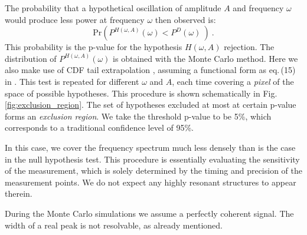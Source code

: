 The probability that a hypothetical oscillation of amplitude $A$ and frequency $\omega$ would produce less power at frequency $\omega$ then observed is:
\begin{equation}
  \mathrm{Pr}\left( P^{H(\omega, A)}(\omega) < P^D(\omega)\ \right) \ .
\end{equation}
This probability is the p-value for the hypothesis $H(\omega, A)$ rejection. The distribution of $P^{H(\omega, A)}(\omega)$ is obtained with the Monte Carlo method. Here we also make use of CDF tail extrapolation , assuming a functional form as eq.\,(15) in \cite{Scargle1982} . This test is repeated for different $\omega$ and $A$, each time covering a \emph{pixel} of the space of possible hypotheses. This procedure is shown schematically in Fig.\,\ref{fig:exclusion_region}. The set of hypotheses excluded at most at certain p-value forms an \emph{exclusion region}. We take the threshold p-value to be 5\%, which corresponds to a traditional confidence level of 95\%.

In this case, we cover the frequency spectrum much less densely than is the case in the null hypothesis test. This procedure is essentially evaluating the sensitivity of the measurement, which is solely determined by the timing and precision of the measurement points. We do not expect any highly resonant structures to appear therein.

During the Monte Carlo simulations we assume a perfectly coherent signal. The width of a real peak is not resolvable, as already mentioned.


